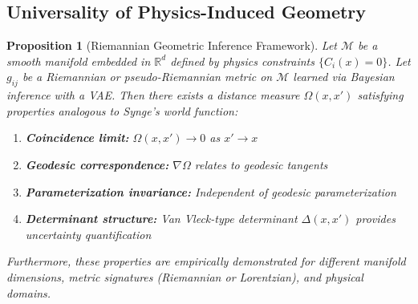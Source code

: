 \documentclass[11pt,a4paper]{article}
\newtheorem{theorem}{Proposition}
\begin{document}
\subsection{Universality of Physics-Induced Geometry}

\begin{theorem}[Riemannian Geometric Inference Framework]
Let $\mathcal{M}$ be a smooth manifold embedded in $\mathbb{R}^d$ defined by physics constraints $\{C_i(x) = 0\}$. Let $g_{ij}$ be a Riemannian or pseudo-Riemannian metric on $\mathcal{M}$ learned via Bayesian inference with a VAE. Then there exists a distance measure $\Omega(x,x')$ satisfying properties analogous to Synge's world function:

\begin{enumerate}
\item \textbf{Coincidence limit:} $\Omega(x,x') \to 0$ as $x' \to x$
\item \textbf{Geodesic correspondence:} $\nabla\Omega$ relates to geodesic tangents
\item \textbf{Parameterization invariance:} Independent of geodesic parameterization
\item \textbf{Determinant structure:} Van Vleck-type determinant $\Delta(x,x')$ provides uncertainty quantification
\end{enumerate}

Furthermore, these properties are empirically demonstrated for different manifold dimensions, metric signatures (Riemannian or Lorentzian), and physical domains.
\end{theorem}
\end{document}
